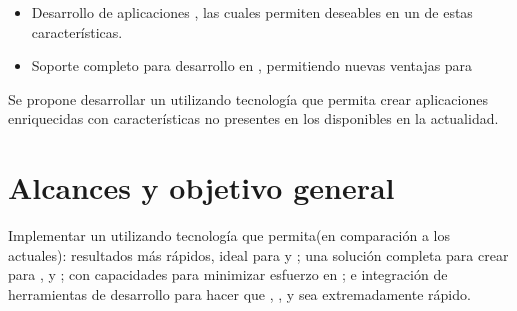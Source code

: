 \begin{itemize}
	\item
		Desarrollo de aplicaciones \realTimeINT, \reactive las cuales permiten deseables \featuresCPT en un \frameworkPC de estas características.
	\item
		Soporte completo para desarrollo en \devicesINT \mobilesINT, permitiendo nuevas ventajas para \ecommerceCOM \cite{cook2015mobile}
\end{itemize}



Se propone desarrollar un \frameworkPC \freePC \openSourcePC utilizando tecnología \webINT que permita crear aplicaciones enriquecidas con características no presentes en los \frameworksPC \ecommerceCOM \freePC \openSourcePC disponibles en la actualidad.


\section{Alcances y objetivo general}\label{cap:intro:alcances}

Implementar un \frameworkPC \ecommerceCOM utilizando tecnología \freePC \openSourcePC que permita(en comparación a los \frameworksPC actuales):  resultados más rápidos, ideal para \prototypesCPT y \mvpSiglasCOM; una solución completa para crear \featuresCPT para \serversAS \cite{online_ecommerce_solution_requires}, \browsersINT y \devicesINT \mobilesINT; \builtINPL con capacidades \realTimeINT para minimizar esfuerzo en \developmentPC; e integración de herramientas de desarrollo para hacer que \setupCPT, \developmentPC, y \deploymentCPT sea extremadamente rápido. 

